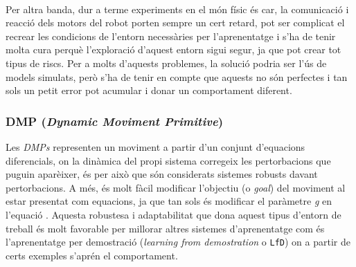 \documentclass[12pt,a4paper,final,twoside]{article}
\begin{document}
\paragraph{}Per altra banda, dur a terme experiments en el món físic és car, la comunicació i reacció dels motors del robot porten sempre un cert retard, pot ser complicat el recrear les condicions de l'entorn necessàries per l'aprenentatge i s'ha de tenir molta cura perquè l'exploració d'aquest entorn sigui segur, ja que pot crear tot tipus de riscs. Per a molts d'aquests problemes, la solució podria ser l'ús de models simulats, però s'ha de tenir en compte que aquests no són perfectes i tan sols un petit error pot acumular i donar un comportament diferent.

\subsubsection{DMP (\textit{Dynamic Moviment Primitive})}
\label{DMP-estat-de-l'art}


Les \textit{DMPs} representen un moviment a partir d'un conjunt d'equacions diferencials, on la dinàmica del propi sistema corregeix les pertorbacions que puguin aparèixer, és per això que són considerats sistemes robusts davant pertorbacions. A més, és molt fàcil modificar l'objectiu (o \textit{goal}) del moviment al estar presentat com equacions, ja que tan sols és modificar el paràmetre \textit{g} en l'equació . Aquesta robustesa i adaptabilitat que dona aquest tipus d'entorn de treball és molt favorable per millorar altres sistemes d'aprenentatge com és l'aprenentatge per demostració (\textit{learning from demostration} o \texttt{LfD}) on a partir de certs exemples s'aprén el comportament.
\end{document}
